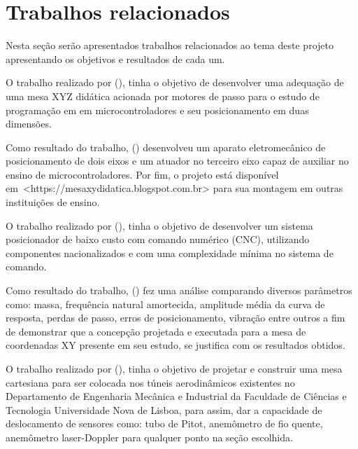 \section{Trabalhos relacionados}\label{sec:trabalhos}

Nesta seção serão apresentados trabalhos relacionados ao tema deste projeto apresentando os objetivos e resultados 
de cada um.

O trabalho realizado por \citeauthor{butignol2017adequaccao} (\citeyear{butignol2017adequaccao}), 
tinha o objetivo de desenvolver uma adequação de uma mesa XYZ didática acionada por motores 
de passo para o estudo de programação em em microcontroladores e seu posicionamento em duas dimensões.

Como resultado do trabalho, \citeauthor{butignol2017adequaccao} (\citeyear{butignol2017adequaccao}) 
desenvolveu um aparato eletromecânico de posicionamento de dois eixos e um atuador no terceiro eixo 
capaz de auxiliar no ensino de microcontroladores. Por fim, o projeto está disponível 
em~<https://mesaxydidatica.blogspot.com.br> para sua montagem em outras instituições de ensino.

O trabalho realizado por \citeauthor{camargo1988mesa} (\citeyear{camargo1988mesa}), tinha o objetivo de 
desenvolver um sistema posicionador de baixo custo com comando numérico (CNC), utilizando componentes 
nacionalizados e com uma complexidade mínima no sistema de comando.

Como resultado do trabalho, \citeauthor{camargo1988mesa} (\citeyear{camargo1988mesa}) fez uma análise 
comparando diversos parâmetros como: massa, frequência natural amortecida, amplitude média da curva de 
resposta, perdas de passo, erros de posicionamento, vibração entre outros a fim de demonstrar que a 
concepção projetada e executada para a mesa de coordenadas XY presente em seu estudo, se 
justifica com os resultados obtidos.

O trabalho realizado por \citeauthor{ramos2018desenvolvimento} (\citeyear{ramos2018desenvolvimento}), 
tinha o objetivo de projetar e construir uma mesa cartesiana para ser colocada nos túneis 
aerodinâmicos existentes no Departamento de Engenharia Mecânica e Industrial da Faculdade de Ciências e 
Tecnologia Universidade Nova de Lisboa, para assim, dar a capacidade de deslocamento de sensores como: tubo de Pitot, 
anemômetro de fio quente, anemômetro laser-Doppler para qualquer ponto na seção escolhida.

